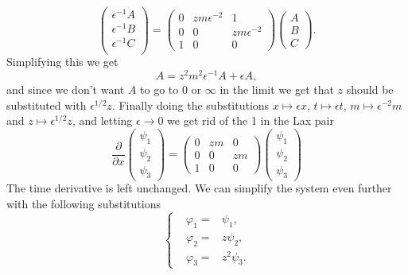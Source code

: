\documentclass[english,master]{liumaiex}
\theoremstyle{plain}
\theoremstyle{definition}
\begin{document}
\begin{equation}
\begin{pmatrix} 
	\epsilon^{-1} A \\
	\epsilon^{-1} B \\
	\epsilon^{-1} C \\
\end{pmatrix} =
\begin{pmatrix}
	0 & zm\epsilon^{-2} & 1 \\
	0 & 0 & zm\epsilon^{-2}  \\
	1 & 0 & 0
\end{pmatrix}
\begin{pmatrix} A \\ B \\ C \end{pmatrix} .
\end{equation}
Simplifying this we get
\begin{equation}
	A = z^2m^2\epsilon^{-1}A + \epsilon A,
\end{equation}
and since we don't want $A$ to go to $0$ or $\infty$ in the limit we get that $z$ should be substituted with $\epsilon^{1/2}z$.
Finally doing the substitutions $x \mapsto \epsilon x$, $t \mapsto \epsilon t$, $m \mapsto \epsilon^{-2} m$ and $z \mapsto \epsilon^{1/2}z$, and letting $\epsilon \rightarrow 0$ we get rid of the 1 in the Lax pair
\begin{equation}
\frac{\partial}{\partial x}
\begin{pmatrix} \psi_1 \\ \psi_2 \\ \psi_3 \end{pmatrix} =
\begin{pmatrix}
	0 & zm & 0 \\
	0 & 0 & zm \\
	1 & 0 & 0
\end{pmatrix}
\begin{pmatrix} \psi_1 \\ \psi_2 \\ \psi_3 \end{pmatrix}
\end{equation}
The time derivative is left unchanged. We can simplify the system even further with the following substitutions
\begin{equation}
\left\{ \begin{aligned}
	&\varphi_1 = &\psi_1, \\
	&\varphi_2 = &z\psi_2, \\
	&\varphi_3 = &z^2\psi_3.
\end{aligned} \right.
\end{equation}
\end{document}
